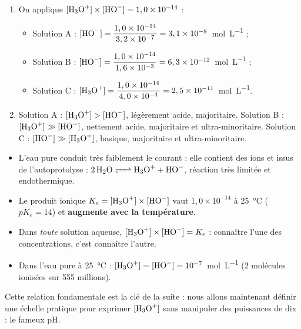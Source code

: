 \documentclass[11pt]{article}
\newcommand{\cle}[1]{{\popxbold\color{popdark}#1}}
\begin{document}
\begin{corrige}
\begin{enumerate}
\item On applique $[\ce{H3O+}] \times [\ce{HO-}] = 1,0 \times 10^{-14}$ :
\begin{itemize}
\item Solution A : $[\ce{HO-}] = \dfrac{1,0 \times 10^{-14}}{3,2 \times 10^{-7}} = 3,1 \times 10^{-8}$~\si{mol.L^{-1}} ;
\item Solution B : $[\ce{HO-}] = \dfrac{1,0 \times 10^{-14}}{1,6 \times 10^{-3}} = 6,3 \times 10^{-12}$~\si{mol.L^{-1}} ;
\item Solution C : $[\ce{H3O+}] = \dfrac{1,0 \times 10^{-14}}{4,0 \times 10^{-4}} = 2,5 \times 10^{-11}$~\si{mol.L^{-1}}.
\end{itemize}
\item Solution A : $[\ce{H3O+}] > [\ce{HO-}]$, légèrement acide,  majoritaire. Solution B : $[\ce{H3O+}] \gg [\ce{HO-}]$, nettement acide,  majoritaire et  ultra-minoritaire. Solution C : $[\ce{HO-}] \gg [\ce{H3O+}]$, basique,  majoritaire et  ultra-minoritaire.
\end{enumerate}
\end{corrige}

\begin{aretenir}
\begin{itemize}
\item L'eau pure conduit très faiblement le courant : elle contient des ions  et  issus de l'\cle{autoprotolyse} : $\ce{2 H2O <=> H3O+ + HO-}$, réaction très limitée et endothermique.
\item Le \cle{produit ionique} $K_e = [\ce{H3O+}] \times [\ce{HO-}]$ vaut $1,0 \times 10^{-14}$ à \SI{25}{\celsius} ($pK_e = 14$) et \textbf{augmente avec la température}.
\item Dans \emph{toute} solution aqueuse, $[\ce{H3O+}] \times [\ce{HO-}] = K_e$ : connaître l'une des concentrations, c'est connaître l'autre.
\item Dans l'eau pure à \SI{25}{\celsius} : $[\ce{H3O+}] = [\ce{HO-}] = 10^{-7}$~\si{mol.L^{-1}} (2 molécules ionisées sur 555 millions).
\end{itemize}
Cette relation fondamentale est la clé de la suite : nous allons maintenant définir une échelle pratique pour exprimer $[\ce{H3O+}]$ sans manipuler des puissances de dix : le fameux \cle{pH}.
\end{aretenir}
\end{document}

